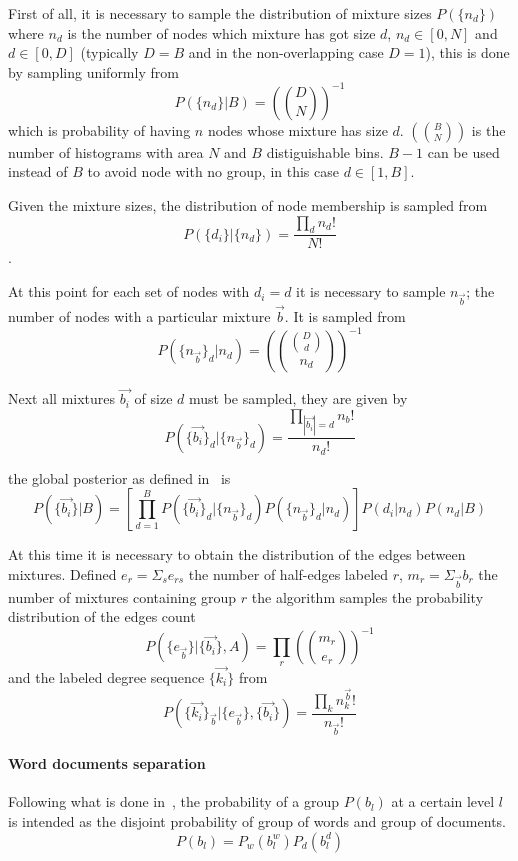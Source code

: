 First of all, it is necessary to sample the distribution of mixture sizes
$P(\{n_d\})$ where $n_d$ is the number of nodes which mixture has got size $d$, $n_d\in[0,N]$ and $d\in[0,D]$ (typically $D=B$
and in the non-overlapping case $D=1$), this is done by sampling uniformly from
\[P(\{n_d\}|B)=\left(\binom{D}{N}\right)^{-1}\] which is probability of having $n$ nodes whose mixture has size $d$.
$\left(\binom{B}{N}\right)$ is the number of histograms with
area $N$ and $B$ distiguishable bins. $B-1$ can be used instead of $B$ to avoid node with no group, in this case $d\in[1,B]$.

Given the mixture sizes, the distribution of node membership
is sampled from \[P(\{d_i\}|\{n_d\})=\frac{\prod_{d} n_d!}{N!}\].

At this point for each set of nodes with $d_i=d$ it is necessary to sample $n_{\vec{b}}$; the number of nodes
with a particular mixture $\vec{b}$.
It is sampled from
\begin{equation}
  P(\{n_{\vec{b}}\}_d|n_d)=\left(\binom{\binom{D}{d}}{n_d}\right)^{-1}
\end{equation}

Next all mixtures $\vec{b_i}$ of size $d$ must be sampled, they are given by
\begin{equation}
  P(\{\vec{b_i}\}_d|\{n_{\vec{b}}\}_d)=\frac{\prod_{|\vec{b_i}|=d} n_b!}{n_d!}
\end{equation}

the global posterior as defined in~\cite{peixoto2015model} is
\begin{equation}
  P(\{\vec{b_i}\}|B)=\left[\prod_{d=1}^B  P(\{\vec{b_i}\}_d|\{n_{\vec{b}}\}_d) P(\{n_{\vec{b}}\}_d|n_d)\right]P({d_i}|{n_d})P(n_d|B)
\end{equation}

At this time it is necessary to obtain the distribution of the edges between
mixtures. Defined $e_r=\Sigma_s e_{rs}$ the number of half-edges labeled $r$,
$m_r=\Sigma_{\vec{b}} b_r$ the number of mixtures containing group $r$ the
algorithm samples the probability distribution of the edges count
\[P(\{e_{\vec{b}}\}|\{\vec{b_i}\}, A)=\prod_r\left(\binom{m_r}{e_r}\right)^{-1}\] and the
labeled degree sequence $\{\vec{k_i}\}$ from
\[P(\{\vec{k_i}\}_{\vec{b}}|\{e_{\vec{b}}\}, \{\vec{b_i}\})=\frac{\prod_k n_k^{\vec{b}}!}{n_{\vec{b}}!}\]


\paragraph{Word documents separation}
Following what is done in~\cite{gerlach2018network}, the probability of a group $P(b_l)$ at a certain level $l$ is intended as the disjoint probability of
group of words and group of documents.
\begin{equation}
  P(b_l)=P_w(b_l^w)P_d(b_l^d)
\end{equation}

